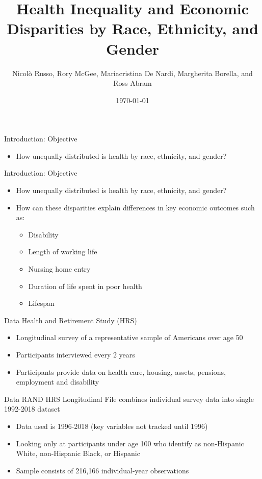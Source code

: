 \documentclass[10pt]{beamer}
\title{Health Inequality and Economic Disparities by Race, Ethnicity, and Gender}
\date{\today}
\author{Nicolò Russo, Rory McGee, Mariacristina De Nardi, Margherita Borella, and Ross Abram}
\institute{Presented by Jake Harmon}
\begin{document}
\maketitle

\begin{frame}{Introduction: Objective}
\large{
    \begin{itemize}
        \item How unequally distributed is health by race, ethnicity, and gender? \\
    \end{itemize}
}
\end{frame}

\begin{frame}{Introduction: Objective}
\large{
    \begin{itemize}
        \item How unequally distributed is health by race, ethnicity, and gender? \\
        \item How can these disparities explain differences in key economic outcomes such as:
        \begin{itemize}
            \item Disability
            \item Length of working life
            \item Nursing home entry
            \item Duration of life spent in poor health
            \item Lifespan
        \end{itemize}
    \end{itemize}
}
\end{frame}

\begin{frame}{Data}
    Health and Retirement Study (HRS) 
    \begin{itemize}
        \item Longitudinal survey of a representative sample of Americans over age 50 \\
        \item Participants interviewed every 2 years \\
        \item Participants provide data on health care, housing, assets, pensions, employment and disability
    \end{itemize}
\end{frame}

\begin{frame}{Data}
    RAND HRS Longitudinal File combines individual survey data into single 1992-2018 dataset
    \begin{itemize}
        \item Data used is 1996-2018 (key variables not tracked until 1996) \\
        \item Looking only at participants under age 100 who identify as non-Hispanic White, non-Hispanic Black, or Hispanic \\
        \item Sample consists of 216,166 individual-year observations
    \end{itemize}
\end{frame}
\end{document}
